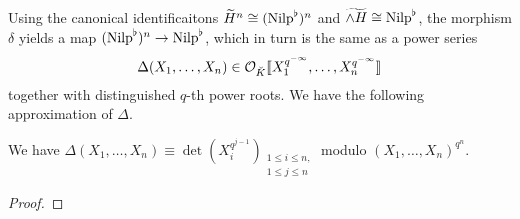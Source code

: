 \documentclass[../main.tex]{subfiles}
\begin{document}
Using the canonical identificaitons $\widetilde{H}^n \cong ({\mathrm{Nilp}}^\flat)^n$
and $\widetilde{\wedge H} \cong {\mathrm{Nilp}}^\flat$, the morphism $\delta$ yields a 
map $({\mathrm{Nilp}}^\flat)^n \to {\mathrm{Nilp}}^\flat$, which in turn is the same as a power series 
\begin{equation*}
  \Delta(X_1, \dots, X_n) \in \mathcal{O}_{\breve K}\llbracket X_1^{q^{-\infty}}, \dots,
  X_n^{q^{-\infty}}\rrbracket
\end{equation*}
together with distinguished $q$-th power roots. 
We have the following approximation of $\Delta$. 
\begin{lem}\label{lem:DeltaApprox}
  We have $\Delta(X_1, \dots, X_n) \equiv \det(X_i^{q^{j-1}})_{\substack{1 \leq i \leq n,\\ 1 \leq j \leq n}}$ modulo $(X_1, \dots, X_n)^{q^n}$.
\begin{proof}
\end{proof}
\end{lem}




\end{document}
